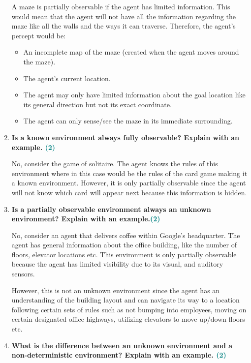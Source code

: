 \documentclass[a4paper]{article}
\begin{document}
\begin{sloppypar}
\begin{enumerate}[start=1,label=Q\arabic*,left=0pt]
    \par A maze is partially observable if the agent has limited information. This would mean that the agent
    will not have all the information regarding the maze like all the walls and the ways it can traverse. Therefore,
    the agent's percept would be:
    \begin{itemize}
        \item An incomplete map of the maze (created when the agent moves around the maze).
        \item The agent's current location.
        \item The agent may only have limited information about the goal location like its general direction but not its exact coordinate.
        \item The agent can only sense/see the maze in its immediate surrounding.
    \end{itemize}
    
    \item \textbf{Is a known environment always fully observable? Explain with an example. \hfill \textcolor{teal}{(2)}}
    
    \par No, consider the game of solitaire. The agent knows the rules of this environment where in this case would be the rules
    of the card game making it a known environment. However, it is only partially observable since the agent will not know which card will
    appear next because this information is hidden.
    
    \item \textbf{Is a partially observable environment always an unknown environment? Explain with an example.\hfill \textcolor{teal}{(2)}}
    
    \par No, consider an agent that delivers coffee within Google's headquarter. The agent has general information about the office building,
    like the number of floors, elevator locations etc. This environment is only partially observable because the agent has limited visibility due to
    its visual, and auditory sensors. 
    
    However, this is not an unknown environment since the agent has an understanding of the building layout and
    can navigate its way to a location following certain sets of rules such as not bumping into employees, moving on certain designated office highways,
    utilizing elevators to move up/down floors etc.

    \item \textbf{What is the difference between an unknown environment and a non-deterministic environment? Explain with an example. \hfill \textcolor{teal}{(2)}}
    

\end{enumerate}
\end{sloppypar}
\end{document}
